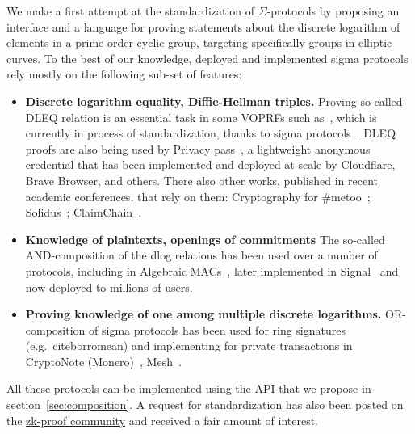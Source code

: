 \documentclass[runningheads]{llncs}
\begin{document}
We make a first attempt at the standardization of $\Sigma$-protocols by proposing an interface and a language for proving statements about the discrete logarithm of elements in a prime-order cyclic group, targeting specifically groups in elliptic curves. To the best of our knowledge, deployed and implemented sigma protocols rely mostly on the following sub-set of features:

\begin{itemize}
  \item \textbf{Discrete logarithm equality, Diffie-Hellman triples.}
  Proving so-called DLEQ relation is an essential task in some VOPRFs such as~\cite{AC:JarKiaKra14},
  which is currently in process of standardization, thanks to sigma protocols~\cite{cfrg-voprf}.
  DLEQ proofs are also being used by Privacy pass~\cite{PoPETS:DGSTV18}, a lightweight anonymous credential that has been implemented and deployed at scale by Cloudflare, Brave
  Browser, and others.
  There also other works, published in recent academic conferences, that rely on them: Cryptography for \#metoo~\cite{PoPETS:KuyKraRab19}; Solidus~\cite{CCS:CZJKJS17}; ClaimChain~\cite{ClaimChain}.
  \item \textbf{Knowledge of plaintexts, openings of commitments}
  The so-called AND-composition of the dlog relations has been used over a number of protocols,
  including in Algebraic MACs~\cite{CCS:ChaMeiZav14},
  later implemented in Signal~\cite{CCS:ChaPerZav20} and now deployed to millions of users.
  \item \textbf{Proving knowledge of one among multiple discrete logarithms.}
  OR-composition of sigma protocols
  has been used for ring signatures (e.g.~cite{borromean}) and implementing for private transactions in CryptoNote (Monero)~\cite{monero}, Mesh~\cite{PoPETS:AlTGon19}.
\end{itemize}


All these protocols can be implemented using the API that we propose in section~\cref{sec:composition}.
A request for standardization has also been posted on the \href{https://community.zkproof.org/t/standardizing-sigma-protocols/471/}{zk-proof community} and received a fair amount of interest.

\end{document}
